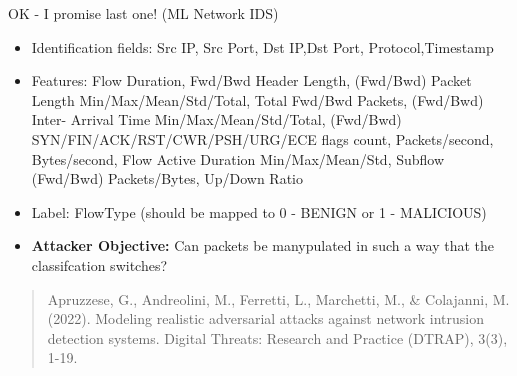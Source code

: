 \documentclass[t,compress,aspectratio=169]{beamer}
\begin{document}
\begin{frame}[fragile]{OK - I promise last one! (ML Network IDS)}
    \begin{itemize}
        \item Identification fields: Src IP, Src Port, Dst IP,Dst Port, Protocol,Timestamp
        \item Features: Flow Duration, Fwd/Bwd Header Length, (Fwd/Bwd) Packet Length Min/Max/Mean/Std/Total, Total Fwd/Bwd Packets, (Fwd/Bwd) Inter- Arrival Time Min/Max/Mean/Std/Total, (Fwd/Bwd) SYN/FIN/ACK/RST/CWR/PSH/URG/ECE flags count, Packets/second, Bytes/second, Flow Active Duration Min/Max/Mean/Std, Subflow (Fwd/Bwd) Packets/Bytes, Up/Down Ratio
        \item Label: FlowType (should be mapped to 0 - BENIGN or 1 - MALICIOUS)
        \item \textbf{\textcolor{aisecred}{Attacker Objective:}} Can packets be manypulated in such a way that the classifcation switches?

    \end{itemize}

    \begin{quote}\tiny
Apruzzese, G., Andreolini, M., Ferretti, L., Marchetti, M., \& Colajanni, M. (2022). Modeling realistic adversarial attacks against network intrusion detection systems. Digital Threats: Research and Practice (DTRAP), 3(3), 1-19.
	 \end{quote}





\end{frame}

\end{document}
